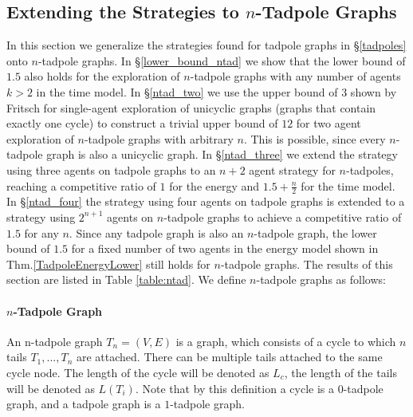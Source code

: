 \subsection{Extending the Strategies to $n$-Tadpole Graphs} \label{ntadpoles}
In this section we generalize the strategies found for tadpole graphs in \S\ref{tadpoles} onto $n$-tadpole graphs. In \S\ref{lower_bound_ntad} we show that the lower bound of $1.5$ also holds for the exploration
of $n$-tadpole graphs with any number of agents $k > 2$ in the time model. In \S\ref{ntad_two} we use the upper bound of $3$ shown by Fritsch \cite{Fritsch2021} for single-agent exploration of unicyclic graphs (graphs that contain exactly one cycle)
to construct a trivial upper bound of $12$ for two agent exploration of $n$-tadpole graphs with arbitrary $n$. This is possible, since every $n$-tadpole graph is also a unicyclic graph. In \S\ref{ntad_three} we extend the strategy using three agents on tadpole graphs to an $n+2$ agent strategy for $n$-tadpoles, reaching a competitive ratio of 
$1$ for the energy and $1.5+\frac{n}{2}$ for the time model. In \S\ref{ntad_four} the strategy using four agents on tadpole graphs is extended to a strategy using $2^{n+1}$ agents on $n$-tadpole graphs to achieve
a competitive ratio of $1.5$ for any $n$. Since any tadpole graph is also an $n$-tadpole graph, the lower bound of $1.5$ for a fixed number of two agents in the energy model
shown in Thm.\ref{TadpoleEnergyLower} still holds for $n$-tadpole graphs. The results of this section are listed in Table \ref{table:ntad}. We define $n$-tadpole graphs as follows:

\paragraph*{$n$-Tadpole Graph} An n-tadpole graph $T_n=(V,E)$ is a graph, which consists of a cycle to which
$n$ tails $T_1,...,T_n$ are attached. There can be multiple tails attached to the same cycle node. The length of the cycle will be denoted as $L_c$, the length of the tails
will be denoted as $L(T_i)$. Note that by this definition a cycle is a $0$-tadpole graph, and a tadpole graph is 
a $1$-tadpole graph. 

